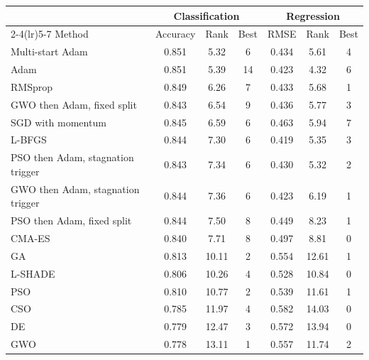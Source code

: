 \begin{tabular}{lcccccc}
\toprule
 & \multicolumn{3}{c}{Classification} & \multicolumn{3}{c}{Regression} \\
\cmidrule(lr){2-4}\cmidrule(lr){5-7}
Method & Accuracy & Rank & Best & RMSE & Rank & Best \\
\midrule
Multi-start Adam & 0.851 & 5.32 & 6 & 0.434 & 5.61 & 4 \\
Adam & 0.851 & 5.39 & 14 & 0.423 & 4.32 & 6 \\
RMSprop & 0.849 & 6.26 & 7 & 0.433 & 5.68 & 1 \\
GWO then Adam, fixed split & 0.843 & 6.54 & 9 & 0.436 & 5.77 & 3 \\
SGD with momentum & 0.845 & 6.59 & 6 & 0.463 & 5.94 & 7 \\
L-BFGS & 0.844 & 7.30 & 6 & 0.419 & 5.35 & 3 \\
PSO then Adam, stagnation trigger & 0.843 & 7.34 & 6 & 0.430 & 5.32 & 2 \\
GWO then Adam, stagnation trigger & 0.844 & 7.36 & 6 & 0.423 & 6.19 & 1 \\
PSO then Adam, fixed split & 0.844 & 7.50 & 8 & 0.449 & 8.23 & 1 \\
CMA-ES & 0.840 & 7.71 & 8 & 0.497 & 8.81 & 0 \\
GA & 0.813 & 10.11 & 2 & 0.554 & 12.61 & 1 \\
L-SHADE & 0.806 & 10.26 & 4 & 0.528 & 10.84 & 0 \\
PSO & 0.810 & 10.77 & 2 & 0.539 & 11.61 & 1 \\
CSO & 0.785 & 11.97 & 4 & 0.582 & 14.03 & 0 \\
DE & 0.779 & 12.47 & 3 & 0.572 & 13.94 & 0 \\
GWO & 0.778 & 13.11 & 1 & 0.557 & 11.74 & 2 \\
\bottomrule
\end{tabular}
